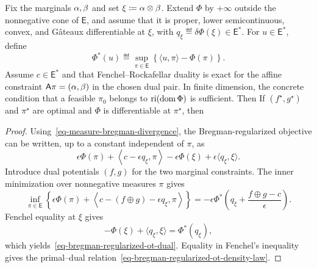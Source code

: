 \begin{prop}\label{prop-bregman-regularized-ot-dual}
	Fix the marginals $\alpha,\beta$ and set $\xi\coloneqq\alpha\otimes\beta$. Extend $\Phi$ by $+\infty$ outside the nonnegative cone of $\mathsf E$, and assume that it is proper, lower semicontinuous, convex, and G\^ateaux differentiable at $\xi$, with $q_\xi\eqdef\delta\Phi(\xi)\in\mathsf E^*$. For $u\in\mathsf E^*$, define
	\[
		\Phi^*(u)
		\eqdef
			\sup_{\pi\in\mathsf E}
		\left\{
			\langle u,\pi\rangle-\Phi(\pi)
		\right\}.
	\]
		Assume $c\in\mathsf E^*$ and that Fenchel--Rockafellar duality is exact for the affine constraint $\mathsf A\pi=(\alpha,\beta)$ in the chosen dual pair. In finite dimension, the concrete condition that a feasible $\pi_0$ belongs to $\operatorname{ri}(\operatorname{dom}\Phi)$ is sufficient. Then
	If $(f^\star,g^\star)$ and $\pi^\star$ are optimal and $\Phi$ is differentiable at $\pi^\star$, then
\end{prop}

\begin{proof}
	Using~\eqref{eq-measure-bregman-divergence}, the Bregman-regularized objective can be written, up to a constant independent of $\pi$, as
	\[
		\epsilon\Phi(\pi)
		+
			\left\langle c-\epsilon q_\xi,\pi\right\rangle
			-\epsilon\Phi(\xi)+\epsilon\langle q_\xi,\xi\rangle.
	\]
	Introduce dual potentials $(f,g)$ for the two marginal constraints. The inner minimization over nonnegative measures $\pi$ gives
	\[
		\inf_{\pi\in\mathsf E}
		\left\{
			\epsilon\Phi(\pi)
			+
				\left\langle c-(f\oplus g)-\epsilon q_\xi,\pi\right\rangle
		\right\}
		=
		-\epsilon
		\Phi^*\!\left(
				q_\xi+\frac{f\oplus g-c}{\epsilon}
		\right).
	\]
	Fenchel equality at $\xi$ gives
	\[
		-\Phi(\xi)+\langle q_\xi,\xi\rangle
		=
		\Phi^*(q_\xi),
	\]
	which yields~\eqref{eq-bregman-regularized-ot-dual}. Equality in Fenchel's inequality gives the primal--dual relation~\eqref{eq-bregman-regularized-ot-density-law}.
\end{proof}

